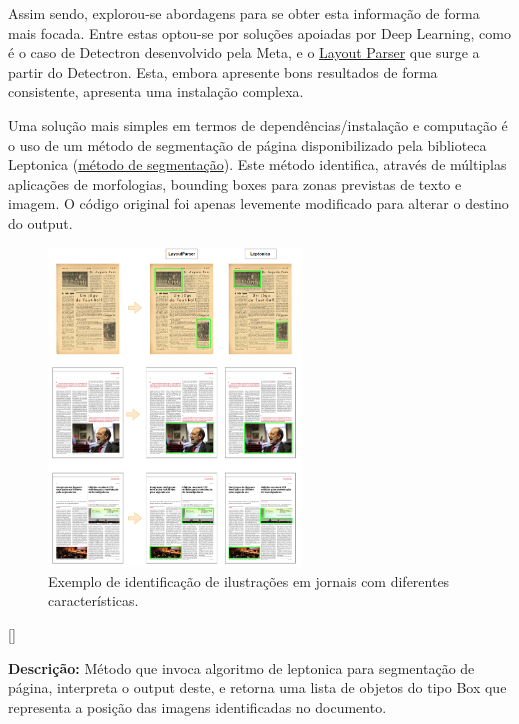 Assim sendo, explorou-se abordagens para se obter esta informação de forma mais focada.
Entre estas optou-se por soluções apoiadas por Deep Learning, como é o caso de Detectron desenvolvido pela Meta, e o \href{https://layout-parser.readthedocs.io/en/latest/index.html}{Layout Parser} que surge a partir do Detectron. Esta, embora apresente bons resultados de forma consistente, apresenta uma instalação complexa.

Uma solução mais simples em termos de dependências/instalação e computação é o uso de um método de segmentação de página disponibilizado pela biblioteca Leptonica (\href{https://tpgit.github.io/Leptonica/livre__pageseg_8c_source.html}{método de segmentação}). 
Este método identifica, através de múltiplas aplicações de morfologias, bounding boxes para zonas previstas de texto e imagem.
O código original foi apenas levemente modificado para alterar o destino do output.


\begin{figure}[H]
	\centering
	\includegraphics[width=0.6\textwidth]{images/ilustracoes/identify_images_example.png}
	\caption{Exemplo de identificação de ilustrações em jornais com diferentes características.}
	\label{fig:identify_images_example}
\end{figure}


[\normalsize]

\textbf{Descrição:} Método que invoca algoritmo de leptonica para segmentação de página, interpreta o output deste, e retorna uma lista de objetos do tipo Box que representa a posição das imagens identificadas no documento.


